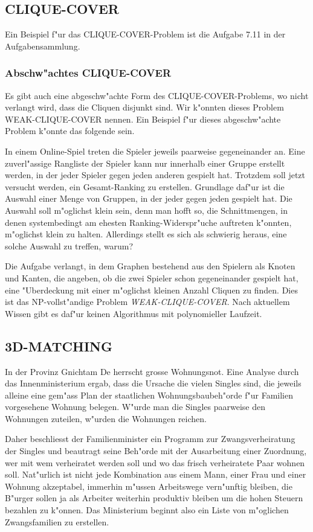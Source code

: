 \subsection{CLIQUE-COVER}
Ein Beispiel f"ur das CLIQUE-COVER-Problem ist die Aufgabe 7.11 in der
Aufgabensammlung.

\subsubsection{Abschw"achtes CLIQUE-COVER}
Es gibt auch eine abgeschw"achte Form des CLIQUE-COVER-Problems, wo
nicht verlangt wird, dass die Cliquen disjunkt sind.
Wir k"onnten dieses Problem WEAK-CLIQUE-COVER nennen.
Ein Beispiel f"ur dieses abgeschw"achte Problem k"onnte das folgende sein.

In einem Online-Spiel treten die Spieler jeweils paarweise gegeneinander an.
Eine zuverl"assige Rangliste der Spieler kann nur innerhalb
einer Gruppe erstellt werden, in der jeder Spieler gegen
jeden anderen gespielt hat. Trotzdem soll jetzt versucht werden,
ein Gesamt-Ranking zu erstellen. Grundlage daf"ur ist die Auswahl
einer Menge von Gruppen, in der jeder gegen jeden gespielt hat.
Die Auswahl soll m"oglichst klein sein, denn man hofft so, die
Schnittmengen, in denen systembedingt am ehesten Ranking-Widerspr"uche
auftreten k"onnten, m"oglichst klein zu halten. Allerdings stellt es
sich als schwierig heraus, eine solche Auswahl zu treffen, warum?

\medskip

Die Aufgabe verlangt, in dem Graphen bestehend aus den Spielern
als Knoten und Kanten, die angeben, ob die zwei Spieler schon gegeneinander
gespielt hat, eine "Uberdeckung mit einer m"oglichst
kleinen Anzahl Cliquen zu finden. Dies ist das NP-vollst"andige Problem
{\it WEAK-CLIQUE-COVER}. Nach aktuellem Wissen gibt es daf"ur keinen
Algorithmus mit polynomieller Laufzeit.

\subsection{3D-MATCHING}
In der Provinz Gnichtam De herrscht grosse Wohnungsnot.
Eine Analyse durch das Innenministerium ergab, dass die Ursache
die vielen Singles sind, die jeweils alleine eine gem"ass
Plan der staatlichen Wohnungsbaubeh"orde f"ur Familien vorgesehene
Wohnung belegen.
W"urde man die Singles paarweise den Wohnungen zuteilen, w"urden die
Wohnungen reichen.

Daher beschliesst der Familienminister ein Programm zur Zwangsverheiratung
der Singles und beautragt seine Beh"orde mit der Ausarbeitung einer Zuordnung,
wer mit wem verheiratet werden soll und wo das frisch verheiratete Paar
wohnen soll.
Nat"urlich ist nicht jede Kombination aus einem Mann,
einer Frau und einer Wohnung akzeptabel, immerhin m"ussen 
Arbeitswege vern"unftig bleiben, die B"urger sollen ja als 
Arbeiter weiterhin produktiv bleiben um die hohen Steuern bezahlen zu k"onnen.
Das Ministerium beginnt also ein Liste von m"oglichen Zwangsfamilien
zu erstellen.


